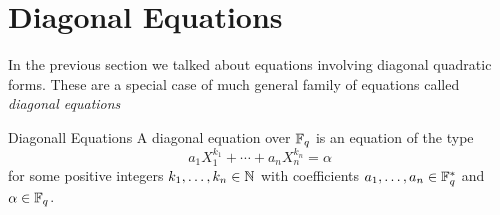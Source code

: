 \section{Diagonal Equations}\label{sec:diagonal-equations}
In the previous section we talked about equations involving diagonal quadratic forms. These are a special case of much general family of equations called \emph{diagonal equations}
\begin{Definition}{Diagonall Equations}{}
  A diagonal equation over $\mathbb{F}_q$ is an equation of the type $$a_1X_1^{k_1}+\cdots+a_nX_n^{k_n}=\alpha$$ for some positive integers $k_1,\dots,k_n\in\mathbb{N}$ with coefficients $a_1,\dots,a_n\in\mathbb{F}_q^*$ and $\alpha\in\mathbb{F}_q$.
\end{Definition}


